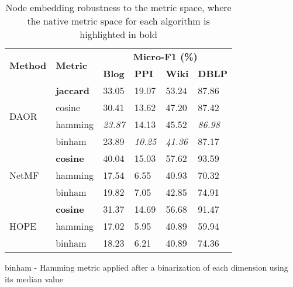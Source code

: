 \documentclass[conference]{IEEEtran}
\begin{document}
\begin{table}[htbp]\small \vspace{-4pt}
\caption{Node embedding robustness to the metric space, where the native metric space for each algorithm is highlighted in bold}
\label{tbl:metric}
\centering
\vspace{-4pt}
\begin{tabular}{@{}ll|llll@{}}
\hline
\multirow{2}{*}{\textbf{Method}} & \multirow{2}{*}{\textbf{Metric}} & \multicolumn{4}{c}{\textbf{Micro-F1 (\%)}}                   \\ \cline{3-6}
&                                  & \textbf{Blog} & \textbf{PPI} & \textbf{Wiki} & \textbf{DBLP} \\ \hline
\multirow{4}{*}{DAOR}            & \textbf{jaccard}                 & 33.05         & 19.07        & 53.24         & 87.86         \\
                                 & cosine                           & 30.41         & 13.62        & 47.20         & 87.42         \\
                                 & hamming                          & \textit{23.87}         & 14.13        & 45.52         & \textit{86.98}         \\
                                 & binham                          & 23.89         & \textit{10.25}        & \textit{41.36}         & 87.17         \\ \hline
\multirow{3}{*}{NetMF}           & \textbf{cosine}                  & 40.04         & 15.03        & 57.62         & 93.59         \\
                                 & hamming                          & 17.54         & 6.55         & 40.93         & 70.32         \\
                                 & binham                          & 19.82         & 7.05         & 42.85         & 74.91         \\ \hline
\multirow{3}{*}{HOPE}           & \textbf{cosine}                  & 31.37          & 14.69          & 56.68 		 & 91.47         \\
                                 & hamming                          & 17.02         & 5.95         & 40.89         & 59.94         \\
                                 & binham                          & 18.23         & 6.21         & 40.89         & 74.36         \\ \hline
\end{tabular}
\begin{flushleft}
\footnotesize{
binham  - Hamming metric applied after a binarization of each dimension using its median value
}
\end{flushleft}
\vspace{-4pt}
\end{table}
\end{document}
